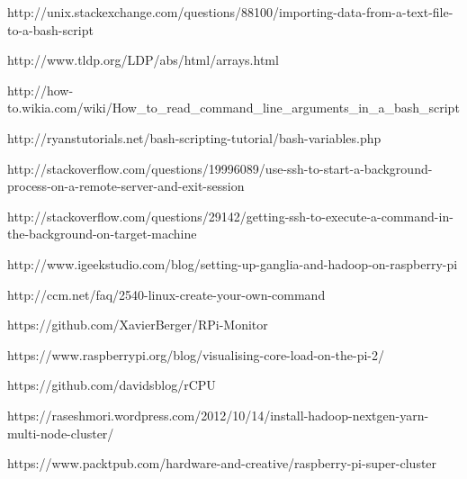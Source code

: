 \documentclass[]{article}
\begin{document}
http://unix.stackexchange.com/questions/88100/importing-data-from-a-text-file-to-a-bash-script

http://www.tldp.org/LDP/abs/html/arrays.html

http://how-to.wikia.com/wiki/How\_to\_read\_command\_line\_arguments\_in\_a\_bash\_script

http://ryanstutorials.net/bash-scripting-tutorial/bash-variables.php

http://stackoverflow.com/questions/19996089/use-ssh-to-start-a-background-process-on-a-remote-server-and-exit-session

http://stackoverflow.com/questions/29142/getting-ssh-to-execute-a-command-in-the-background-on-target-machine

http://www.igeekstudio.com/blog/setting-up-ganglia-and-hadoop-on-raspberry-pi

http://ccm.net/faq/2540-linux-create-your-own-command

https://github.com/XavierBerger/RPi-Monitor

https://www.raspberrypi.org/blog/visualising-core-load-on-the-pi-2/

https://github.com/davidsblog/rCPU

https://raseshmori.wordpress.com/2012/10/14/install-hadoop-nextgen-yarn-multi-node-cluster/

https://www.packtpub.com/hardware-and-creative/raspberry-pi-super-cluster
\end{document}
